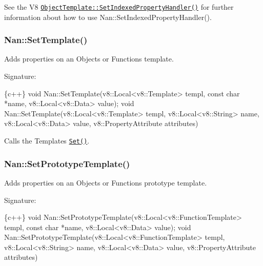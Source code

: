 See the V8 \href{https://v8docs.nodesource.com/io.js-3.0/db/d5f/classv8_1_1_object_template.html#ac0234cbede45d51778bb5f6a32a9e125}{\tt {\ttfamily Object\+Template\+::\+Set\+Indexed\+Property\+Handler()}} for further information about how to use {\ttfamily Nan\+::\+Set\+Indexed\+Property\+Handler()}.

\label{_api_nan_set_template}%
 \subsubsection*{Nan\+::\+Set\+Template()}

Adds properties on an {\ttfamily Object}\textquotesingle{}s or {\ttfamily Function}\textquotesingle{}s template.

Signature\+:


\begin{DoxyCode}
\{c++\}
void Nan::SetTemplate(v8::Local<v8::Template> templ,
                      const char *name,
                      v8::Local<v8::Data> value);
void Nan::SetTemplate(v8::Local<v8::Template> templ,
                      v8::Local<v8::String> name,
                      v8::Local<v8::Data> value,
                      v8::PropertyAttribute attributes)
\end{DoxyCode}


Calls the {\ttfamily Template}\textquotesingle{}s \href{https://v8docs.nodesource.com/io.js-3.0/db/df7/classv8_1_1_template.html#a2db6a56597bf23c59659c0659e564ddf}{\tt {\ttfamily Set()}}.

\label{_api_nan_set_prototype_template}%
 \subsubsection*{Nan\+::\+Set\+Prototype\+Template()}

Adds properties on an {\ttfamily Object}\textquotesingle{}s or {\ttfamily Function}\textquotesingle{}s prototype template.

Signature\+:


\begin{DoxyCode}
\{c++\}
void Nan::SetPrototypeTemplate(v8::Local<v8::FunctionTemplate> templ,
                               const char *name,
                               v8::Local<v8::Data> value);
void Nan::SetPrototypeTemplate(v8::Local<v8::FunctionTemplate> templ,
                               v8::Local<v8::String> name,
                               v8::Local<v8::Data> value,
                               v8::PropertyAttribute attributes)
\end{DoxyCode}


